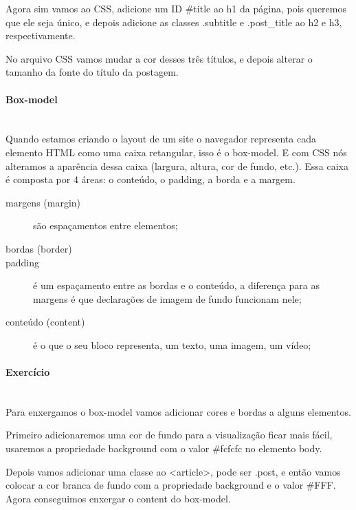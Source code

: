 \documentclass[12pt,a4paper]{article}
\begin{document}
	Agora sim vamos ao CSS, adicione um ID \#title ao h1 da página, pois queremos que ele seja único, e depois adicione as classes .subtitle e .post\_title ao h2 e h3, respectivamente.
	
	No arquivo CSS vamos mudar a cor desses três títulos, e depois alterar o tamanho da fonte do título da postagem.
	
	\paragraph{Box-model} \mbox{} \\
	
	Quando estamos criando o layout de um site o navegador representa cada elemento HTML  como uma caixa retangular, isso é o box-model. E com CSS nós alteramos a aparência dessa caixa (largura, altura, cor de fundo, etc.). Essa caixa é composta por 4 áreas: o conteúdo, o padding, a borda e a margem.
	
	\begin{description}
		\item[margens (margin)] são espaçamentos entre elementos;
		
		\item[bordas (border)]
		
		\item[padding] é um espaçamento entre as bordas e o conteúdo, a diferença para as margens é que declarações de imagem de fundo funcionam nele;
		
		\item[conteúdo (content)] é o que o seu bloco representa, um texto, uma imagem, um vídeo;
		
	\end{description}
	
	\paragraph{Exercício} \mbox{} \\
	
	Para enxergamos o box-model vamos adicionar cores e bordas a alguns elementos.
	
	Primeiro adicionaremos uma cor de fundo para a visualização ficar mais fácil, usaremos a propriedade background com o valor \#fcfcfc no elemento body.
	
	Depois vamos adicionar uma classe ao <article>, pode ser .post, e então vamos colocar a cor branca de fundo com a propriedade background e o valor \#FFF. Agora conseguimos enxergar o content do box-model.
	
\end{document}
